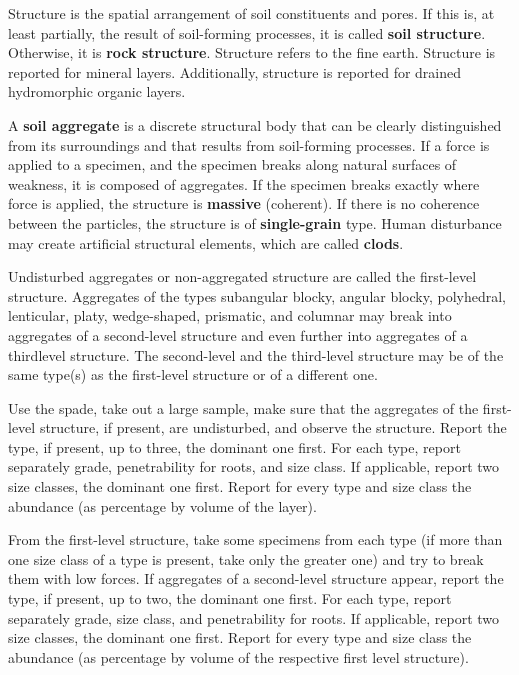 \documentclass[
  letterpaper,
  DIV=11,
  numbers=noendperiod]{scrreprt}
\begin{document}
Structure is the spatial arrangement of soil constituents and pores. If
this is, at least partially, the result of soil-forming processes, it is
called \textbf{soil structure}. Otherwise, it is \textbf{rock
structure}. Structure refers to the fine earth. Structure is reported
for mineral layers. Additionally, structure is reported for drained
hydromorphic organic layers.

A \textbf{soil aggregate} is a discrete structural body that can be
clearly distinguished from its surroundings and that results from
soil-forming processes. If a force is applied to a specimen, and the
specimen breaks along natural surfaces of weakness, it is composed of
aggregates. If the specimen breaks exactly where force is applied, the
structure is \textbf{massive} (coherent). If there is no coherence
between the particles, the structure is of \textbf{single-grain} type.
Human disturbance may create artificial structural elements, which are
called \textbf{clods}.

Undisturbed aggregates or non-aggregated structure are called the
first-level structure. Aggregates of the types subangular blocky,
angular blocky, polyhedral, lenticular, platy, wedge-shaped, prismatic,
and columnar may break into aggregates of a second-level structure and
even further into aggregates of a thirdlevel structure. The second-level
and the third-level structure may be of the same type(s) as the
first-level structure or of a different one.

Use the spade, take out a large sample, make sure that the aggregates of
the first-level structure, if present, are undisturbed, and observe the
structure. Report the type, if present, up to three, the dominant one
first. For each type, report separately grade, penetrability for roots,
and size class. If applicable, report two size classes, the dominant one
first. Report for every type and size class the abundance (as percentage
by volume of the layer).

From the first-level structure, take some specimens from each type (if
more than one size class of a type is present, take only the greater
one) and try to break them with low forces. If aggregates of a
second-level structure appear, report the type, if present, up to two,
the dominant one first. For each type, report separately grade, size
class, and penetrability for roots. If applicable, report two size
classes, the dominant one first. Report for every type and size class
the abundance (as percentage by volume of the respective first level
structure).
\end{document}
